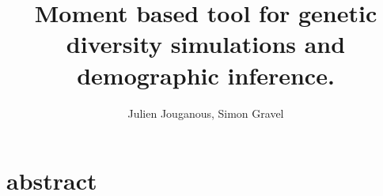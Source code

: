 \documentclass[11pt,a4paper]{article}
\title{\bf Moment based tool for genetic diversity simulations and demographic inference.}
\author{Julien Jouganous, Simon Gravel}
\begin{document}
\maketitle

\section*{abstract}










\nocite{*}



\end{document}
